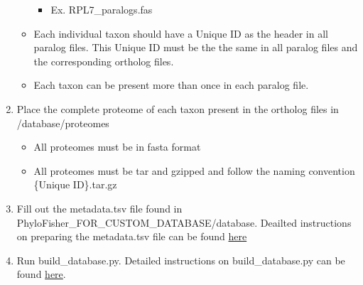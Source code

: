 \documentclass{article}
\begin{document}
\begin{enumerate}
\begin{itemize}
                \begin{itemize}
                    \item Ex. RPL7\_paralogs.fas
                \end{itemize}
                \item Each individual taxon should have a Unique ID as the header in all paralog files. This Unique ID must be the the same in all paralog files and the corresponding ortholog files.
                \item Each taxon can be present more than once in each paralog file.
            \end{itemize}
            \item Place the complete proteome of each taxon present in the ortholog files in /database/proteomes
            \begin{itemize}
                \item All proteomes must be in fasta format
                \item All proteomes must be tar and gzipped and follow the naming convention \{Unique ID\}.tar.gz
            \end{itemize}
            \item Fill out the metadata.tsv file found in PhyloFisher\_FOR\_CUSTOM\_DATABASE/database. Deailted instructions on preparing the metadata.tsv file can be found \hyperref[sec:metadata]{here}
            \item Run build\_database.py. Detailed instructions on build\_database.py can be found \hyperref[sec:builddb]{here}.
        \end{enumerate}
        
\end{document}
